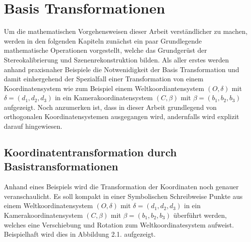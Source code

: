 \chapter{Basis Transformationen }

Um die mathematischen Vorgehensweisen dieser Arbeit verständlicher zu machen, werden in den folgenden Kapiteln zunächst ein paar Grundlegende mathematische Operationen vorgestellt, welche das Grundgerüst der Stereokalibrierung und Szenenrekonstruktion bilden. Als aller erstes werden anhand praxisnaher Beispiele die Notwenidigkeit der Basis Transformation und damit einhergehend der Spezialfall einer Transformation von einem Koordinatensystem wie zum Beispiel einem Weltkoordiantensystem $(O,\delta)$ mit $\delta=(d_1, d_2, d_3)$ in ein Kamerakoordinatensystem $(C,\beta)$ mit $\beta=(b_1,b_2,b_3)$ aufgezeigt. Noch anzumerken ist, dass in dieser Arbeit grundlegend von orthogonalen Koordinatensystemen ausgegangen wird, andernfalls wird explizit darauf hingewiesen. 



%
%

\section{Koordinatentransformation durch Basistransformationen}

Anhand eines Beispiels wird die Transformation der Koordinaten noch genauer veranschaulicht. Es soll kompakt in einer Symbolischen Schreibweise Punkte aus einem Weltkoordinatensystem  
$(O,\delta)$ mit $\delta = (d_1,d_2,d_3)$ in ein Kamerakoordinatensystem  $(C,\beta)$ mit $\beta = (b_1,b_2,b_3)$ überführt werden, welches eine Verschiebung und Rotation zum Weltkoordinatesystem aufweist. Beispielhaft wird dies in Abbildung 2.1. aufgezeigt.
 
